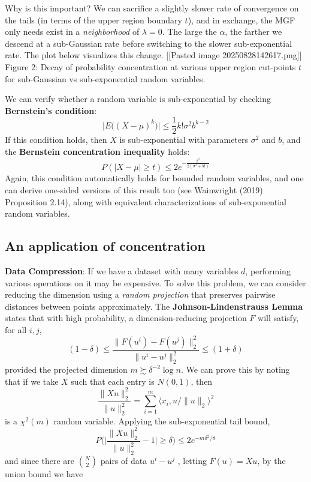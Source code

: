 \documentclass[
]{article}
\begin{document}
Why is this important? We can sacrifice a slightly slower rate of
convergence on the tails (in terms of the upper region boundary \(t\)),
and in exchange, the MGF only needs exist in a \emph{neighborhood} of
\(\lambda = 0\). The large the \(\alpha\), the farther we descend at a
sub-Gaussian rate before switching to the slower sub-exponential rate.
The plot below visualizes this change. {[}{[}Pasted image
20250828142617.png{]}{]} Figure 2: Decay of probability concentration at
various upper region cut-points \(t\) for sub-Gaussian vs
sub-exponential random variables.

We can verify whether a random variable is sub-exponential by checking
\textbf{Bernstein's condition}:
\[\Big|E\Big((X - \mu)^k\Big)\Big| \leq \frac{1}{2}k! \sigma^2 b^{k-2}\]
If this condition holds, then \(X\) is sub-exponential with parameters
\(\sigma^2\) and \(b\), and the \textbf{Bernstein concentration
inequality} holds:
\[P(|X - \mu| \geq t) \leq 2e^{-\frac{t^2}{2(\sigma^2 + bt)}}\] Again,
this condition automatically holds for bounded random variables, and one
can derive one-sided versions of this result too (see Wainwright (2019)
Proposition 2.14), along with equivalent characterizations of
sub-exponential random variables.

\hypertarget{an-application-of-concentration}{%
\subsection{An application of
concentration}\label{an-application-of-concentration}}

\textbf{Data Compression}: If we have a dataset with many variables
\(d\), performing various operations on it may be expensive. To solve
this problem, we can consider reducing the dimension using a
\emph{random projection} that preserves pairwise distances between
points approximately. The \textbf{Johnson-Lindenstrauss Lemma} states
that with high probability, a dimension-reducing projection \(F\) will
satisfy, for all \(i, j\),
\[(1 - \delta) \leq \frac{\lVert F(u^i) - F(u^j) \rVert_2^2}{\lVert u^i - u^j \rVert_2^2} \leq (1 + \delta)\]
provided the projected dimension \(m \succsim \delta^{-2} \log n\). We
can prove this by noting that if we take \(X\) such that each entry is
\(N(0,1)\), then
\[\frac{\lVert Xu \rVert_2^2}{\lVert u \rVert_2^2} = \sum_{i=1}^m \langle x_i, u/\lVert u\rVert_2\rangle^2\]
is a \(\chi^2(m)\) random variable. Applying the sub-exponential tail
bound,
\[P\Big(\Big|\frac{\lVert Xu \rVert_2^2}{\lVert u \rVert_2^2} - 1\Big| \geq \delta\Big) \leq 2e^{-m\delta^2 / 8}\]
and since there are \(N \choose 2\) pairs of data \(u^i - u^j\) ,
letting \(F(u) = Xu\), by the union bound we have
\end{document}
